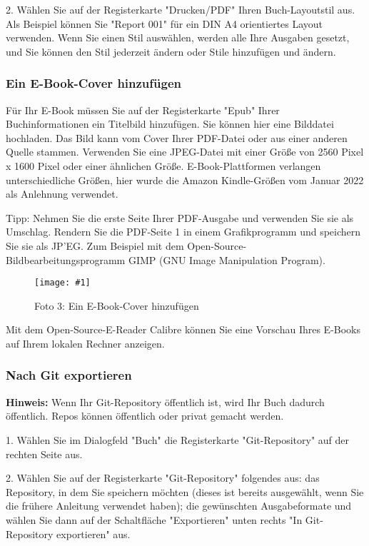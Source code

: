 \documentclass{article}
\newlength{\imgwidth}
\newcommand\scaledgraphics[2]{%
                
\settowidth{\imgwidth}{\texttt{[image: \#1]}}%
                
\setlength{\imgwidth}{\minof{\imgwidth}{#2\textwidth}}%
                
\texttt{[image: \#1]}%
                
}
\begin{document}
2. Wählen Sie auf der Registerkarte "Drucken/PDF" Ihren Buch-Layoutstil aus. Als Beispiel können Sie "Report 001" für ein DIN A4 orientiertes Layout verwenden. Wenn Sie einen Stil auswählen, werden alle Ihre Ausgaben gesetzt, und Sie können den Stil jederzeit ändern oder Stile hinzufügen und ändern.


\subsubsection{Ein E-Book-Cover hinzufügen}\label{H3514598}



Für Ihr E-Book müssen Sie auf der Registerkarte "Epub" Ihrer Buchinformationen ein Titelbild hinzufügen. Sie können hier eine Bilddatei hochladen. Das Bild kann vom Cover Ihrer PDF-Datei oder aus einer anderen Quelle stammen. Verwenden Sie eine JPEG-Datei mit einer Größe von 2560 Pixel x 1600 Pixel oder einer ähnlichen Größe. E-Book-Plattformen verlangen unterschiedliche Größen, hier wurde die Amazon Kindle-Größen vom Januar 2022 als Anlehnung verwendet.


Tipp: Nehmen Sie die erste Seite Ihrer PDF-Ausgabe und verwenden Sie sie als Umschlag. Rendern Sie die PDF-Seite 1 in einem Grafikprogramm und speichern Sie sie als JP'EG. Zum Beispiel mit dem Open-Source-Bildbearbeitungsprogramm GIMP (GNU Image Manipulation Program).

\begin{figure}
\scaledgraphics{3a695184-36ad-4037-8f67-6d535bd2ef98.png}{1}
\caption*{Foto 3: Ein E-Book-Cover hinzufügen}\label{F15207771}
\end{figure}


Mit dem Open-Source-E-Reader Calibre können Sie eine Vorschau Ihres E-Books auf Ihrem lokalen Rechner anzeigen.


\subsubsection{Nach Git exportieren}\label{H6601276}



\textbf{Hinweis:} Wenn Ihr Git-Repository öffentlich ist, wird Ihr Buch dadurch öffentlich. Repos können öffentlich oder privat gemacht werden.


1. Wählen Sie im Dialogfeld "Buch" die Registerkarte "Git-Repository" auf der rechten Seite aus.


2. Wählen Sie auf der Registerkarte "Git-Repository" folgendes aus: das Repository, in dem Sie speichern möchten (dieses ist bereits ausgewählt, wenn Sie die frühere Anleitung verwendet haben); die gewünschten Ausgabeformate und wählen Sie dann auf der Schaltfläche "Exportieren" unten rechts "In Git-Repository exportieren" aus.
\end{document}

